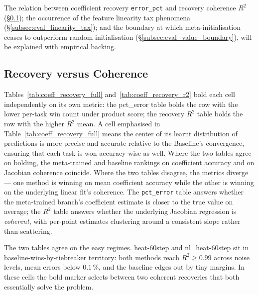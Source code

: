 \documentclass[10pt,journal,compsoc]{IEEEtran}
\begin{document}
The relation between coefficient recovery \texttt{error\_pct} and recovery coherence $R^2$
(\S\ref{subsec:eval_headline_mechanism}); the occurrence of the feature
linearity tax phenomena (\S\ref{subsec:eval_linearity_tax}); and the boundary
at which meta-initialisation ceases to outperform random initialisation
(\S\ref{subsec:eval_value_boundary}), will be explained with empirical
backing.

\subsection{Recovery versus Coherence}\label{subsec:eval_headline_mechanism}



Tables~\ref{tab:coeff_recovery_full} and~\ref{tab:coeff_recovery_r2} bold each
cell independently on its own metric: the pct\_error table bolds the row with
the lower per-task win count under product score; the recovery $R^2$ table
bolds the row with the higher $R^2$ mean. A cell emphasised in
Table~\ref{tab:coeff_recovery_full} means the center of its learnt
distribution of predictions is more precise and accurate relative to the
Baseline's convergence, ensuring that each task is won accuracy-wise as well.
Where the two tables agree on bolding, the meta-trained and baseline rankings on
coefficient accuracy and on Jacobian coherence coincide. Where the two tables
disagree, the metrics diverge --- one method is winning on mean coefficient
accuracy while the other is winning on the underlying linear fit's coherence.
The \texttt{pct\_error} table answers whether the meta-trained branch's
coefficient estimate is closer to the true value on average; the $R^2$ table
answers whether the underlying Jacobian regression is \emph{coherent}, with
per-point estimates clustering around a consistent slope rather than
scattering.

The two tables agree on the easy regimes. heat-60step and
nl\_heat-60step sit in baseline-wins-by-tiebreaker territory: both
methods reach $R^2 \geq 0.99$ across noise levels, mean errors below
$0.1\,\%$, and the baseline edges out by tiny margins. In these
cells the bold marker selects between two coherent recoveries that
both essentially solve the problem.
\end{document}

